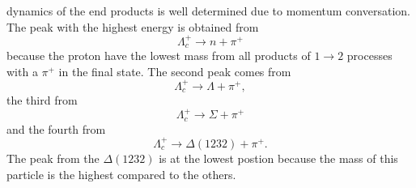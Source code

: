 dynamics of the end products is well determined due to momentum conversation.
The peak with the highest energy is obtained from 
\begin{equation}
  \Lambda_c^+ \rightarrow n + \pi^+ \nonumber
\end{equation}
because the proton have the lowest mass from all products of \( 1 \rightarrow 2 \) 
processes with a \(\pi^+\) in the final state. The second peak comes from 
\begin{equation}
  \Lambda_c^+ \rightarrow \Lambda + \pi^+, \nonumber
\end{equation}
the third from 
\begin{equation}
  \Lambda_c^+ \rightarrow \Sigma + \pi^+ \nonumber
\end{equation}
and the fourth from 
\begin{equation}
  \Lambda_c^+ \rightarrow \Delta(1232) + \pi^+. \nonumber
\end{equation}
The peak from the \(\Delta(1232)\) is at the lowest postion because the mass of 
this particle is the highest compared to the others.

